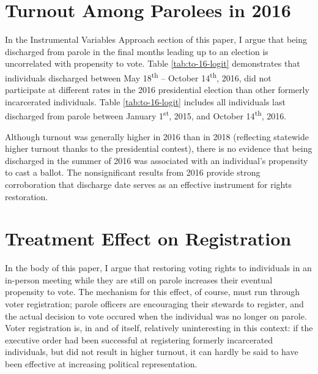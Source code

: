 \documentclass[
  12pt,
]{article}
\author{}
\date{\vspace{-2.5em}}
\begin{document}
{
\setcounter{tocdepth}{2}
\tableofcontents
}
\newpage
\doublespace

\hypertarget{turnout-among-parolees-in-2016}{%
\section*{Turnout Among Parolees in 2016}\label{turnout-among-parolees-in-2016}}

In the Instrumental Variables Approach section of this paper, I argue that being discharged from parole in the final months leading up to an election is uncorrelated with propensity to vote. Table \ref{tab:to-16-logit} demonstrates that individuals discharged between May 18\textsuperscript{th} -- October 14\textsuperscript{th}, 2016, did not participate at different rates in the 2016 presidential election than other formerly incarcerated individuals. Table \ref{tab:to-16-logit} includes all individuals last discharged from parole between January 1\textsuperscript{st}, 2015, and October 14\textsuperscript{th}, 2016.

\begin{singlespace}


\end{singlespace}

Although turnout was generally higher in 2016 than in 2018 (reflecting statewide higher turnout thanks to the presidential contest), there is no evidence that being discharged in the summer of 2016 was associated with an individual's propensity to cast a ballot. The nonsignificant results from 2016 provide strong corroboration that discharge date serves as an effective instrument for rights restoration.

\hypertarget{treatment-effect-on-registration}{%
\section*{Treatment Effect on Registration}\label{treatment-effect-on-registration}}

In the body of this paper, I argue that restoring voting rights to individuals in an in-person meeting while they are still on parole increases their eventual propensity to vote. The mechanism for this effect, of course, must run through voter registration; parole officers are encouraging their stewards to register, and the actual decision to vote occured when the individual was no longer on parole. Voter registration is, in and of itself, relatively uninteresting in this context: if the executive order had been successful at registering formerly incarcerated individuals, but did not result in higher turnout, it can hardly be said to have been effective at increasing political representation.
\end{document}
